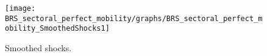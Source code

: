  
\begin{figure}[H]
\centering 
\texttt{[image: BRS\_sectoral\_perfect\_mobility/graphs/BRS\_sectoral\_perfect\_mobility\_SmoothedShocks1]}
\caption{Smoothed shocks.}\label{Fig:SmoothedShocks:1}
\end{figure}


